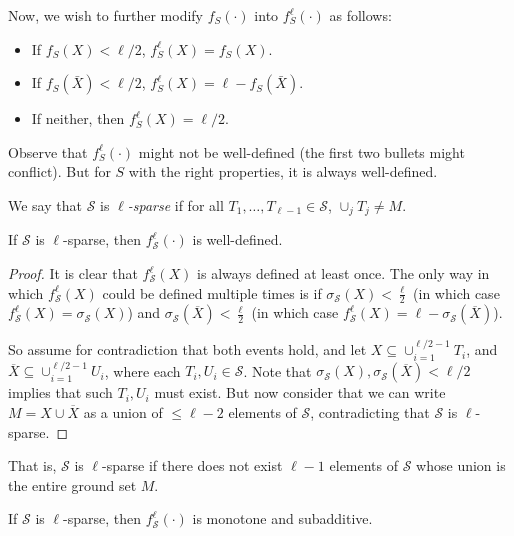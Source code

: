 Now, we wish to further modify $f_S(\cdot)$ into $f_S^\ell(\cdot)$ as follows:
\begin{itemize}
\item If $f_S(X) < \ell/2$, $f_S^\ell(X) = f_S(X)$.
\item If $f_S(\bar{X}) < \ell/2$, $f_S^\ell(X) = \ell - f_S(\bar{X})$.
\item If neither, then $f_S^\ell(X) = \ell/2$.
\end{itemize}

Observe that $f_S^\ell(\cdot)$ might not be well-defined (the first two bullets might conflict). But for $S$ with the right properties, it is always well-defined. 

\begin{definition} We say that $\mathcal{S}$ is \emph{$\ell$-sparse} if for all $T_1,\ldots, T_{\ell-1} \in \mathcal{S}$, $\cup_j T_j \neq M$. \end{definition}

\begin{lemma}
If $\mathcal{S}$ is $\ell$-sparse, then $f^\ell_\mathcal{S}(\cdot)$ is well-defined.
\end{lemma}

\begin{proof}
It is clear that $f^\ell_\mathcal{S}(X)$ is always defined at least once. The only way in which $f^\ell_\mathcal{S}(X)$ could be defined multiple times is if $\sigma_\mathcal{S}(X) < \frac{\ell}{2}$ (in which case $f^\ell_\mathcal{S}(X) = \sigma_\mathcal{S}(X)$) and $\sigma_\mathcal{S}(\overline{X}) < \frac{\ell}{2}$ (in which case $f^\ell_\mathcal{S}(X) = \ell - \sigma_\mathcal{S}(\overline{X})$). 

So assume for contradiction that both events hold, and let $X \subseteq \cup_{i=1}^{\ell/2-1} T_i$, and $\overline{X} \subseteq \cup_{i=1}^{\ell/2-1} U_i$, where each $T_i, U_i \in \mathcal{S}$. Note that $\sigma_\mathcal{S}(X), \sigma_\mathcal{S}(\overline{X}) < \ell/2$ implies that such $T_i, U_i$ must exist. But now consider that we can write $M = X \cup \overline{X}$ as a union of $\leq \ell -2$ elements of $\mathcal{S}$, contradicting that $\mathcal{S}$ is $\ell$-sparse.
\end{proof}
That is, $\mathcal{S}$ is $\ell$-sparse if there does not exist $\ell-1$ elements of $\mathcal{S}$ whose union is the entire ground set $M$. 

\begin{proposition}
If $\mathcal{S}$ is $\ell$-sparse, then $f^\ell_\mathcal{S}(\cdot)$ is monotone and subadditive.
\end{proposition}

